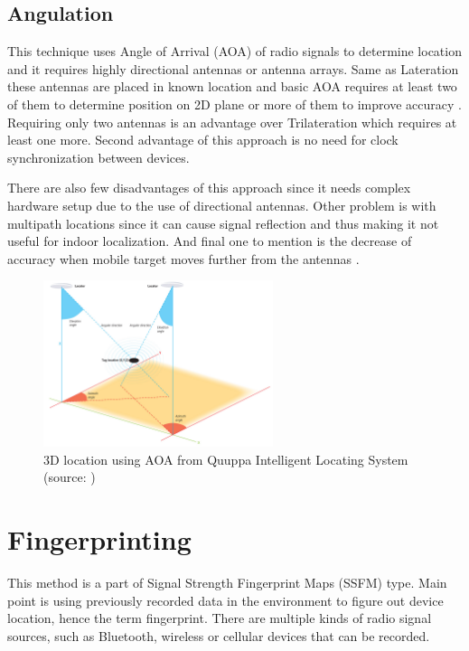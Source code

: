 \subsection{Angulation}\label{sec:Angulation}
This technique uses Angle of Arrival (AOA) of radio signals to determine location and it requires highly directional antennas or antenna arrays. Same as Lateration these antennas are placed in known location and basic AOA requires at least two of them to determine position on 2D plane or more of them to improve accuracy \cite{RAinWILTaS}. Requiring only two antennas is an advantage over Trilateration which requires at least one more. Second advantage of this approach is no need for clock synchronization between devices.

There are also few disadvantages of this approach since it needs complex hardware setup due to the use of directional antennas. Other problem is with multipath locations since it can cause signal reflection and thus making it not useful for indoor localization. And final one to mention is the decrease of accuracy when mobile target moves further from the antennas \cite{AoA, RofAoA}.

\begin{figure}[h!]
	\begin{centering}
		\includegraphics[width=0.6\textwidth]{img/angulation}
		\par\end{centering}
	\caption{3D location using AOA from Quuppa Intelligent Locating System (source: \cite{QAoA})\label{fig:AoAQuuppa}}
	\label{fig03c02}
\end{figure}

\section{Fingerprinting}\label{sec:Fingerprinting}
This method is a part of Signal Strength Fingerprint Maps (SSFM) type. Main point is using previously recorded data in the environment to figure out device location, hence the term fingerprint. There are multiple kinds of radio signal sources, such as Bluetooth, wireless or cellular devices that can be recorded.

